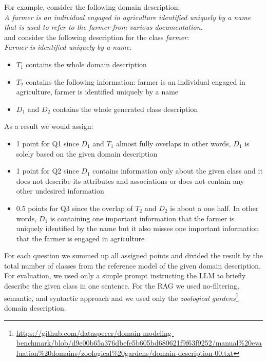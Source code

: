 \noindent{}For example, consider the following domain description: \\

\noindent{}\textit{A farmer is an individual engaged in agriculture identified uniquely by a name that is used to refer to the farmer from various documentation.} \\

\noindent{}and consider the following description for the class \textit{farmer}: \\

\noindent{}\textit{Farmer is identified uniquely by a name.}

\begin{itemize}
\item $T_1$ contains the whole domain description
\item $T_2$ contains the following information: farmer is an individual engaged in agriculture, farmer is identified uniquely by a name
\item $D_1$ and $D_2$ contains the whole generated class description
\end{itemize}

\noindent{}As a result we would assign:

\begin{itemize}
\item 1 point for Q1 since $D_1$ and $T_1$ almost fully overlaps in other words, $D_1$ is solely based on the given domain description
\item 1 point for Q2 since $D_1$ contains information only about the given class and it does not describe its attributes and associations or does not contain any other undesired information
\item 0.5 points for Q3 since the overlap of $T_2$ and $D_2$ is about a one half. In other words, $D_1$ is containing one important information that the farmer is uniquely identified by the name but it also misses one important information that the farmer is engaged in agriculture
\end{itemize}

For each question we summed up all assigned points and divided the result by the total number of classes from the reference model of the given domain description. For evaluation, we used only a simple prompt instructing the LLM to briefly describe the given class in one sentence. For the RAG we used no-filtering, semantic, and syntactic approach and we used only the \emph{zoological gardens}\footnote{\url{https://github.com/dataspecer/domain-modeling-benchmark/blob/d9e00b65a376dbefe5b605bd680621f9f63f9252/manual\%20evaluation\%20domains/zoological\%20gardens/domain-description-00.txt}} domain description.

